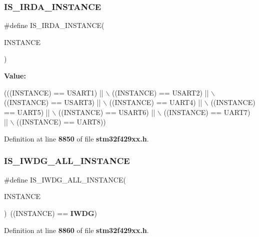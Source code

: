 \subsubsection{I\+S\+\_\+\+I\+R\+D\+A\+\_\+\+I\+N\+S\+T\+A\+N\+CE}
{\footnotesize\ttfamily \#define I\+S\+\_\+\+I\+R\+D\+A\+\_\+\+I\+N\+S\+T\+A\+N\+CE(\begin{DoxyParamCaption}\item[{}]{I\+N\+S\+T\+A\+N\+CE }\end{DoxyParamCaption})}

{\bfseries Value\+:}
\begin{DoxyCode}
(((INSTANCE) == USART1) || \(\backslash\)
                                    ((INSTANCE) == USART2) || \(\backslash\)
                                    ((INSTANCE) == USART3) || \(\backslash\)
                                    ((INSTANCE) == UART4)  || \(\backslash\)
                                    ((INSTANCE) == UART5)  || \(\backslash\)
                                    ((INSTANCE) == USART6) || \(\backslash\)
                                    ((INSTANCE) == UART7)  || \(\backslash\)
                                    ((INSTANCE) == UART8))
\end{DoxyCode}


Definition at line \textbf{ 8850} of file \textbf{ stm32f429xx.\+h}.

\mbox{\label{group__Exported__macros_gad9ec4c52f0572ee67d043e006f1d5e39}} 
\subsubsection{I\+S\+\_\+\+I\+W\+D\+G\+\_\+\+A\+L\+L\+\_\+\+I\+N\+S\+T\+A\+N\+CE}
{\footnotesize\ttfamily \#define I\+S\+\_\+\+I\+W\+D\+G\+\_\+\+A\+L\+L\+\_\+\+I\+N\+S\+T\+A\+N\+CE(\begin{DoxyParamCaption}\item[{}]{I\+N\+S\+T\+A\+N\+CE }\end{DoxyParamCaption})~((I\+N\+S\+T\+A\+N\+CE) == \textbf{ I\+W\+DG})}



Definition at line \textbf{ 8860} of file \textbf{ stm32f429xx.\+h}.

